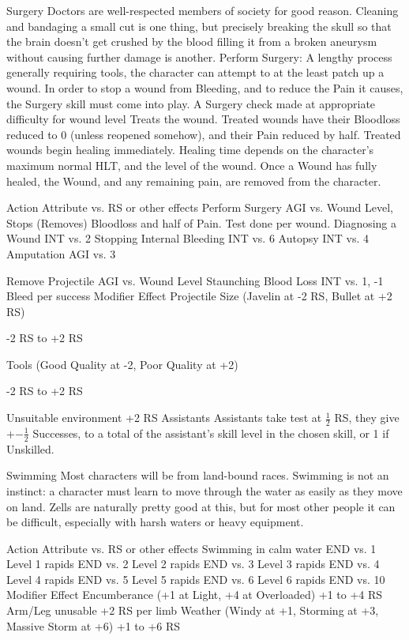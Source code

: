 \documentclass[oneside,11pt,english]{book}
\begin{document}
 

 

Surgery 
Doctors are well-respected members of society for good reason. Cleaning and bandaging a small cut is 
one thing, but precisely breaking the skull so that the brain doesn’t get crushed by the blood filling it from 
a broken aneurysm without causing further damage is another. 
Perform Surgery: A lengthy process generally requiring tools, the character can attempt to at the least 
patch up a wound. In order to stop a wound from Bleeding, and to reduce the Pain it causes, the Surgery 
skill must come into play. A Surgery check made at appropriate difficulty for wound level Treats the 
wound. Treated wounds have their Bloodloss reduced to 0 (unless reopened somehow), and their Pain 
reduced by half. Treated wounds begin healing immediately. Healing time depends on the character’s 
maximum normal HLT, and the level of the wound. 
Once a Wound has fully healed, the Wound, and any remaining pain, are removed from the character. 

 

 

Action Attribute vs. RS or other effects 
Perform Surgery AGI vs. Wound Level, Stops (Removes) Bloodloss and half of Pain. 
Test done per wound. 
Diagnosing a Wound INT vs. 2 
Stopping Internal Bleeding INT vs. 6 
Autopsy INT vs. 4 
Amputation AGI vs. 3 


Remove Projectile AGI vs. Wound Level 
Staunching Blood Loss INT vs. 1, -1 Bleed per success 
Modifier Effect 
Projectile Size (Javelin at -2 
RS, Bullet at +2 RS) 

-2 RS to +2 RS 

Tools (Good Quality at -2, Poor 
Quality at +2) 

-2 RS to +2 RS 

Unsuitable environment +2 RS 
Assistants Assistants take test at $ \frac{1}{2} $ RS, they give +$ -\frac{1}{2} $ Successes, to a total of the 
assistant’s skill level in the chosen skill, or 1 if Unskilled. 

 

 

Swimming 
Most characters will be from land-bound races. Swimming is not an instinct: a character must learn to 
move through the water as easily as they move on land. Zells are naturally pretty good at this, but for 
most other people it can be difficult, especially with harsh waters or heavy equipment. 

 

Action Attribute vs. RS or other effects 
Swimming in calm water END vs. 1 
Level 1 rapids END vs. 2 
Level 2 rapids END vs. 3 
Level 3 rapids END vs. 4 
Level 4 rapids END vs. 5 
Level 5 rapids END vs. 6 
Level 6 rapids END vs. 10 
Modifier Effect 
Encumberance (+1 at Light, +4 at Overloaded) +1 to +4 RS 
Arm/Leg unusable +2 RS per limb 
Weather (Windy at +1, Storming at +3, Massive Storm at +6) +1 to +6 RS 
\end{document}
